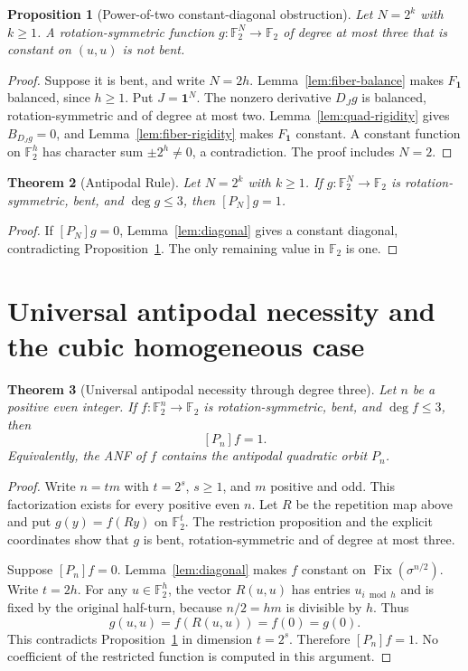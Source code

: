 \documentclass[11pt,a4paper]{article}
\newtheorem{theorem}{Theorem}[section]
\newtheorem{proposition}[theorem]{Proposition}
\theoremstyle{remark}
\theoremstyle{plain}
\newcommand{\F}{\mathbb F_2}
\newcommand{\Fix}{\operatorname{Fix}}
\begin{document}
\begin{proposition}[Power-of-two constant-diagonal obstruction]\label{prop:obstruction}
Let $N=2^k$ with $k\ge1$. A rotation-symmetric function $g:\F^N\to\F$ of degree at most three that is constant on $(u,u)$ is not bent.
\end{proposition}
\begin{proof}
Suppose it is bent, and write $N=2h$. Lemma~\ref{lem:fiber-balance} makes $F_{\mathbf1}$ balanced, since $h\ge1$. Put $J=\mathbf1^N$. The nonzero derivative $D_Jg$ is balanced, rotation-symmetric and of degree at most two. Lemma~\ref{lem:quad-rigidity} gives $B_{D_Jg}=0$, and Lemma~\ref{lem:fiber-rigidity} makes $F_{\mathbf1}$ constant. A constant function on $\F^h$ has character sum $\pm2^h\ne0$, a contradiction. The proof includes $N=2$.
\end{proof}

\begin{theorem}[Antipodal Rule]\label{thm:antipodal}
Let $N=2^k$ with $k\ge1$. If $g:\F^N\to\F$ is rotation-symmetric, bent, and $\deg g\le3$, then $[P_N]g=1$.
\end{theorem}
\begin{proof}
If $[P_N]g=0$, Lemma~\ref{lem:diagonal} gives a constant diagonal, contradicting Proposition~\ref{prop:obstruction}. The only remaining value in $\F$ is one.
\end{proof}

\section{Universal antipodal necessity and the cubic homogeneous case}

\begin{theorem}[Universal antipodal necessity through degree three]\label{thm:universal-antipodal}
Let $n$ be a positive even integer. If $f:\F^n\to\F$ is rotation-symmetric, bent, and $\deg f\le3$, then
\[
[P_n]f=1.
\]
Equivalently, the ANF of $f$ contains the antipodal quadratic orbit $P_n$.
\end{theorem}
\begin{proof}
Write $n=tm$ with $t=2^s$, $s\ge1$, and $m$ positive and odd. This factorization exists for every positive even $n$. Let $R$ be the repetition map above and put $g(y)=f(Ry)$ on $\F^t$. The restriction proposition and the explicit coordinates show that $g$ is bent, rotation-symmetric and of degree at most three.

Suppose $[P_n]f=0$. Lemma~\ref{lem:diagonal} makes $f$ constant on $\Fix(\sigma^{n/2})$. Write $t=2h$. For any $u\in\F^h$, the vector $R(u,u)$ has entries $u_{i\bmod h}$ and is fixed by the original half-turn, because $n/2=hm$ is divisible by $h$. Thus
\[
g(u,u)=f(R(u,u))=f(0)=g(0).
\]
This contradicts Proposition~\ref{prop:obstruction} in dimension $t=2^s$. Therefore $[P_n]f=1$. No coefficient of the restricted function is computed in this argument.
\end{proof}
\end{document}

